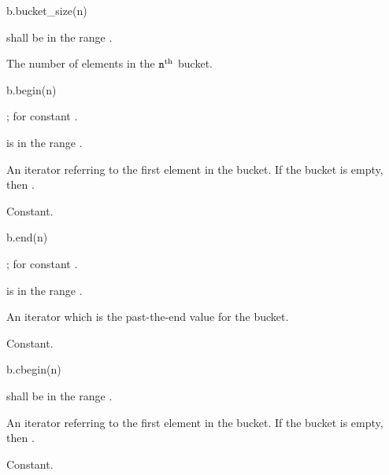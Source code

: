 %
\begin{itemdecl}
b.bucket_size(n)
\end{itemdecl}

\begin{itemdescr}
\pnum
\result
{}

\pnum
\expects
{} shall be in the range \tcode{[0, b.bucket_count())}.

\pnum
\returns
The number of elements in the $\tcode{n}^\text{th}$ bucket.

\pnum
\complexity
{}
\end{itemdescr}

%
\begin{itemdecl}
b.begin(n)
\end{itemdecl}

\begin{itemdescr}
\pnum
\result
{};  for constant .

\pnum
\expects
{} is in the range \tcode{[0, b.bucket_count())}.

\pnum
\returns
An iterator referring to the first element in the bucket.
If the bucket is empty, then .

\pnum
\complexity
Constant.
\end{itemdescr}

%
\begin{itemdecl}
b.end(n)
\end{itemdecl}

\begin{itemdescr}
\pnum
\result
{};  for constant .

\pnum
\expects
{} is in the range \tcode{[0, b.bucket_count())}.

\pnum
\returns
An iterator which is the past-the-end value for the bucket.

\pnum
\complexity
Constant.
\end{itemdescr}

%
\begin{itemdecl}
b.cbegin(n)
\end{itemdecl}

\begin{itemdescr}
\pnum
\result
{}

\pnum
\expects
{} shall be in the range \tcode{[0, b.bucket_count())}.

\pnum
\returns
An iterator referring to the first element in the bucket.
If the bucket is empty, then .

\pnum
\complexity
Constant.
\end{itemdescr}

